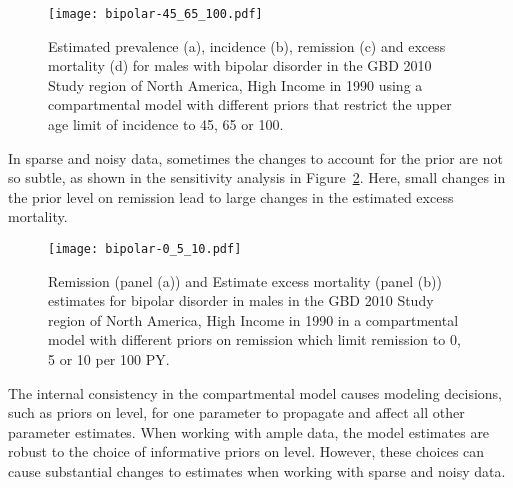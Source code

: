     \begin{figure}[h]
        \begin{center}
            \texttt{[image: bipolar-45\_65\_100.pdf]}
            \caption{Estimated prevalence (a), incidence (b), remission (c) and
              excess mortality (d) for males with bipolar
              disorder in the GBD 2010 Study region of North America, High Income
              in 1990 using a compartmental model with
              different priors that restrict the upper age limit of
              incidence to 45, 65 or 100.}
            \label{fig:app-bipolar onset}
        \end{center}
    \end{figure}

In sparse and noisy data, sometimes the changes to account for the prior
are not so subtle, as shown in the sensitivity analysis in
Figure~\ref{fig:app-bipolar remission}.  Here, small changes in the
prior level on remission lead to large changes in the estimated excess mortality.

    \begin{figure}[h]
        \begin{center}
            \texttt{[image: bipolar-0\_5\_10.pdf]}
            \caption{Remission (panel (a)) and Estimate excess
              mortality (panel (b)) estimates for bipolar disorder in
              males in the GBD 2010 Study region of North America, High Income
              in 1990 in a compartmental model
              with different priors on remission which limit remission
              to 0, 5 or 10 per 100 PY.}
            \label{fig:app-bipolar remission}
        \end{center}
    \end{figure}

The internal consistency in the compartmental model causes modeling
decisions, such as priors on level, for one parameter to propagate and
affect all other parameter estimates.  When working with ample data,
the model estimates are robust to the choice of informative priors on
level.  However, these choices can cause substantial changes to
estimates when working with sparse and noisy data.




